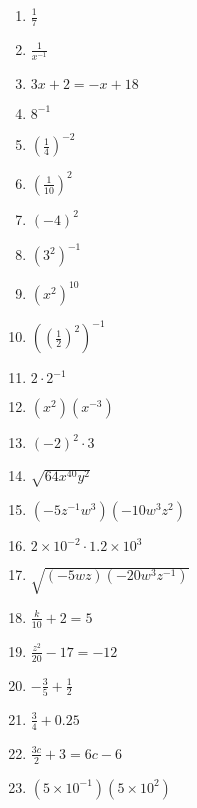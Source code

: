\documentclass[12pt]{article}
\begin{document}
\begin{multicols}{2}
\begin{enumerate}
	\item \( \frac{1}{7} \) \\
	\item \( \frac{1}{x^{-1}} \) \\
	\item \( 3x + 2 = -x + 18 \) \\
	\item \( 8^{-1} \) \\
	\item \( (\frac{1}{4})^{-2} \) \\
	\item \( (\frac{1}{10})^{2} \) \\
	\item \( (-4)^{2} \) \\
	\item \( (3^{2})^{-1} \) \\
	\item \( (x^{2})^{10} \) \\
	\item \( ((\frac{1}{2})^{2})^{-1} \) \\
	\item \( 2 \cdot 2^{-1} \) \\
	\item \( (x^{2})(x^{-3}) \) \\
	\item \( (-2)^{2} \cdot 3 \) \\
	\item \( \sqrt{64x^{40}y^{2}} \) \\
	\item \( (-5z^{-1}w^{3})(-10w^{3}z^{2}) \) \\
	\item \( 2 \times 10^{-2} \cdot 1.2 \times 10^{3}\) \\
	\item \( \sqrt{ (-5wz)(-20w^{3}z^{-1}) } \) \\
	\item \( \frac{k}{10} + 2 = 5 \) \\
	\item \( \frac{z^{2}}{20} - 17 = -12 \) \\
	\item \( -\frac{3}{5} + \frac{1}{2} \) \\
	\item \( \frac{3}{4} + 0.25 \) \\
	\item \( \frac{3c}{2} + 3 = 6c - 6 \) \\
	\item \( (5 \times 10^{-1})(5 \times 10^{2}) \) \\

\end{enumerate}
\end{multicols}
\end{document}
